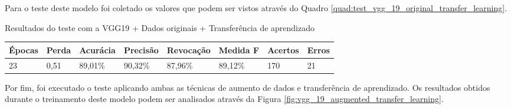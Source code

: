 \documentclass[
	12pt,				%
	oneside,			%
	a4paper,			%
	english,			%
	brazil				%
	]{abntex2ppgsi}
\begin{document}
Para o teste deste modelo foi coletado os valores que podem ser vistos através do Quadro \ref{quad:test_vgg_19_original_transfer_learning}.

\begin{quadro}[H]
\caption{Resultados do teste com a VGG19 + Dados originais + Transferência de aprendizado}
\label{quad:test_vgg_19_original_transfer_learning}
\centering
\begin{tabular}{|l|l|l|l|l|l|l|l|}
\cline{1-8}
Épocas & Perda & Acurácia & Precisão & Revocação & Medida F & Acertos & Erros \\ \hline
23 & 0,51 & 89,01\% & 90,32\% & 87,96\% & 89,12\% & 170 & 21 \\
\cline{1-8}
\end{tabular}
\end{quadro}

Por fim, foi executado o teste aplicando ambas as técnicas de aumento de dados e transferência de aprendizado. Os resultados obtidos durante o treinamento deste modelo podem ser analisados através da Figura \ref{fig:vgg_19_augmented_transfer_learning}.
\end{document}
